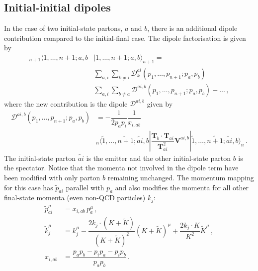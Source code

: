\documentclass[main.tex]{subfiles}
\begin{document}
    \subsection{Initial-initial dipoles}
        In the case of two initial-state partons, $a$ and $b$, there
        is an additional dipole contribution compared to the initial-final case.
        The dipole factorisation is given by
        \begin{equation}\label{eqn:II_factorisation}
            \begin{split}
                {}_{n+1} \langle 1, \ldots, n+1; a,b &| 1, \ldots, n+1;a,b \rangle_{n+1} = \\
                &\sum_{a,i}\sum_{k \neq i} \mathcal{D}_{k}^{ai}(p_{1}, \ldots, p_{n+1};p_{a},p_{b}) \\
                &\sum_{a,i}\sum_{b \neq a} \mathcal{D}^{ai,b}(p_{1}, \ldots, p_{n+1};p_{a},p_{b}) + \ldots \, ,
            \end{split}
        \end{equation}
        where the new contribution is the dipole $\mathcal{D}^{ai,b}$ given by
        \begin{equation}\label{eqn:D_aib}
            \begin{split}
                \mathcal{D}^{ai,b}(p_{1},\ldots,p_{n+1};p_{a},p_{b}) &= -\dfrac{1}{2p_{a}p_{i}} \dfrac{1}{x_{i,ab}} \\
                &{}_{n}\langle \tilde{1}, \ldots, \widetilde{n+1}; \widetilde{ai}, b | \dfrac{\boldsymbol{T}_{b}\cdot\boldsymbol{T}_{ai}}{\boldsymbol{T}^{2}_{ai}}\boldsymbol{V}^{ai,b} | \tilde{1}, \ldots, \widetilde{n+1}; \widetilde{ai}, b \rangle_{n} \, .
            \end{split}
        \end{equation}
        The initial-state parton $\widetilde{ai}$ is the emitter and the
        other initial-state parton $b$ is the spectator. Notice that the
        momenta not involved in the dipole term have been modified with only
        parton $b$ remaining unchanged. The momentum mapping for this case
        has $\tilde{p}_{ai}$ parallel with $p_{a}$ and also
        modifies the momenta for all other final-state momenta (even non-QCD particles) $k_{j}$:
        \begin{align}\label{eqn:II_mapping}
            \tilde{p}_{ai}^{\mu} &= x_{i,ab} \, p_{a}^{\mu} \, , \nonumber \\
            \tilde{k}_{j}^{\mu} &= k_{j}^{\mu} - \dfrac{2k_{j} \cdot (K+\widetilde{K})}{(K+\widetilde{K})^{2}}(K+\widetilde{K})^{\mu} + \dfrac{2k_{j} \cdot K}{K^{2}}\widetilde{K}^{\mu} \, , \\
            x_{i,ab} &= \dfrac{p_{a}p_{b} - p_{i}p_{a}-p_{i}p_{b}}{p_{a}p_{b}} \, . \nonumber
        \end{align}
\end{document}
